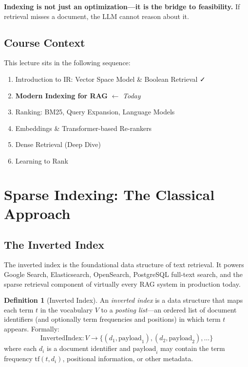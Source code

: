 \documentclass[aspectratio=169]{beamer} \usetheme{TUDelft} %
\theoremstyle{definition}
\newtheorem{definition}{Definition}[section]
\theoremstyle{plain}
\begin{document}
\begin{keytakeaway}
\textbf{Indexing is not just an optimization---it is the bridge to feasibility.} If retrieval misses a document, the LLM cannot reason about it.
\end{keytakeaway}

\subsection{Course Context}

This lecture sits in the following sequence:
\begin{enumerate}
    \item Introduction to IR: Vector Space Model \& Boolean Retrieval \faCheck
    \item \textbf{Modern Indexing for RAG} $\leftarrow$ \textit{Today}
    \item Ranking: BM25, Query Expansion, Language Models
    \item Embeddings \& Transformer-based Re-rankers
    \item Dense Retrieval (Deep Dive)
    \item Learning to Rank
\end{enumerate}

\section{Sparse Indexing: The Classical Approach}
\label{sec:sparse}

\subsection{The Inverted Index}

The inverted index is the foundational data structure of text retrieval. It powers Google Search, Elasticsearch, OpenSearch, PostgreSQL full-text search, and the sparse retrieval component of virtually every RAG system in production today.

\begin{definition}[Inverted Index]
\label{def:inverted-index}
An \emph{inverted index} is a data structure that maps each term $t$ in the vocabulary $V$ to a \emph{posting list}---an ordered list of document identifiers (and optionally term frequencies and positions) in which term $t$ appears. Formally:
\[
\text{InvertedIndex}: V \to \{(d_1, \mathrm{payload}_1), (d_2, \mathrm{payload}_2), \ldots\}
\]
where each $d_i$ is a document identifier and $\mathrm{payload}_i$ may contain the term frequency $\mathrm{tf}(t, d_i)$, positional information, or other metadata.
\end{definition}
\end{document}
